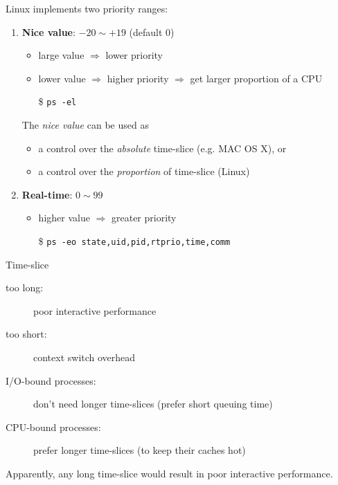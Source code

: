 \begin{frame}
    Linux implements two priority ranges:
  \begin{enumerate}
  \item \textbf{Nice value}: $-20 \sim+19$ (default 0)
    \begin{itemize}
    \item large value $\Rightarrow$ lower priority
    \item lower value $\Rightarrow$ higher priority  $\Rightarrow$ get larger proportion
      of a CPU
    \item[\$] \texttt{ps -el}
    \end{itemize}
    The \emph{nice value} can be used as 
    \begin{itemize}
    \item a control over the \emph{absolute} time-slice (e.g. MAC OS X), or
    \item a control over the \emph{proportion} of time-slice (Linux)
    \end{itemize}
  \item \textbf{Real-time}: $0\sim99$
    \begin{itemize}
    \item higher value $\Rightarrow$ greater priority
    \item[\$] \texttt{ps -eo state,uid,pid,rtprio,time,comm}
    \end{itemize}
  \end{enumerate}
\end{frame}

\begin{frame}{Time-slice}
  \begin{description}
  \item[too long:] poor interactive performance
  \item[too short:] context switch overhead
  \item[I/O-bound processes:] don't need longer time-slices (prefer short queuing time)
  \item[CPU-bound processes:] prefer longer time-slices (to keep their caches hot)
  \end{description}
  Apparently, any long time-slice would result in poor interactive performance.
\end{frame}

